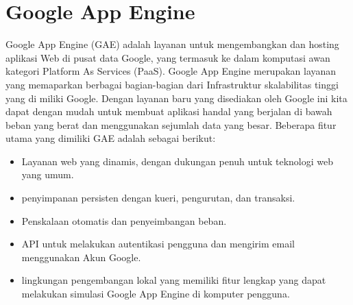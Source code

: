 \section{Google App Engine}
Google App Engine (GAE) adalah layanan untuk mengembangkan dan hosting aplikasi Web di pusat data Google, yang termasuk ke dalam komputasi awan kategori Platform As Services (PaaS). Google App Engine merupakan layanan yang memaparkan berbagai bagian-bagian dari Infrastruktur skalabilitas tinggi yang di miliki Google. Dengan layanan baru yang disediakan oleh Google ini kita dapat dengan mudah untuk membuat aplikasi handal yang berjalan di bawah beban yang berat dan menggunakan sejumlah data yang besar. Beberapa fitur utama yang dimiliki GAE adalah sebagai berikut: \citep{zahariev2009google}
\begin{itemize}
	\itemsep0em
	\item Layanan web yang dinamis, dengan dukungan penuh untuk teknologi web yang umum.
	\item penyimpanan persisten dengan kueri, pengurutan, dan transaksi.
	\item Penskalaan otomatis dan penyeimbangan beban.
	\item API untuk melakukan autentikasi pengguna dan mengirim email menggunakan Akun Google.
	\item lingkungan pengembangan lokal yang memiliki fitur lengkap yang dapat melakukan simulasi Google App Engine di komputer pengguna.
\end{itemize}

